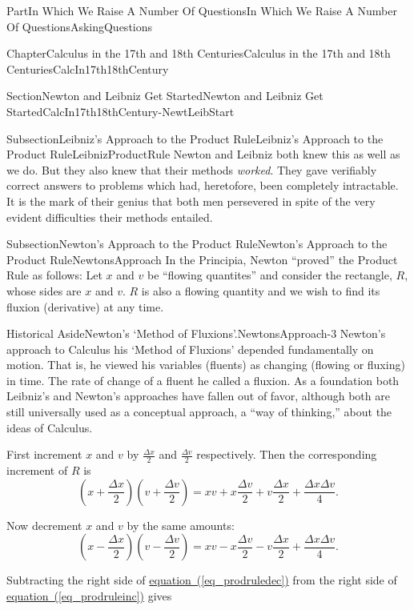\documentclass[oneside,10pt,]{book}
\newcommand{\xreffont}{\relax}
\numberwithin{equation}{part}
\begin{document}
\begin{partptx}{Part}{In Which We Raise A Number Of Questions}{}{In Which We Raise A Number Of Questions}{}{}{AskingQuestions}
\begin{chapterptx}{Chapter}{Calculus in the 17th and 18th Centuries}{}{Calculus in the 17th and 18th Centuries}{}{}{CalcIn17th18thCentury}
\begin{sectionptx}{Section}{Newton and Leibniz Get Started}{}{Newton and Leibniz Get Started}{}{}{CalcIn17th18thCentury-NewtLeibStart}
\begin{subsectionptx}{Subsection}{Leibniz's Approach to the Product Rule}{}{Leibniz's Approach to the Product Rule}{}{}{LeibnizProductRule}
Newton and Leibniz both knew this as well as we do.  But they also knew that their methods \emph{worked}.  They gave verifiably correct answers to problems which had, heretofore, been completely intractable.  It is the mark of their genius that both men persevered in spite of the very evident difficulties their methods entailed.%
\end{subsectionptx}
%
%
\typeout{************************************************}
\typeout{************************************************}
%
\begin{subsectionptx}{Subsection}{Newton's Approach to the Product Rule}{}{Newton's Approach to the Product Rule}{}{}{NewtonsApproach}
In the Principia, Newton ``proved'' the Product Rule as follows: Let \(x\) and \(v\) be ``flowing quantites'' and consider the rectangle, \(R\), whose sides are \(x\) and \(v\).  \(R\) is also a flowing quantity and we wish to find its fluxion (derivative) at any time.%
\begin{historical}{Historical Aside}{Newton's `Method of Fluxions'.}{NewtonsApproach-3}%
Newton's approach to Calculus \textemdash{} his `Method of Fluxions' \textemdash{} depended fundamentally on motion. That is, he viewed his variables (fluents) as changing (flowing or fluxing) in time.  The rate of change of a fluent he called a fluxion.  As a foundation both Leibniz's and Newton's approaches have fallen out of favor, although both are still universally used as a conceptual approach, a ``way of thinking,'' about the ideas of Calculus.%
\end{historical}
First increment \(x\) and \(v\) by \(\frac{\Delta x}{2}\) and \(\frac{\Delta v}{2}\) respectively. Then the corresponding increment of \(R\) is%
\begin{equation}
\left(x+\frac{\Delta x}{2}\right)\left(v+\frac{\Delta v}{2}\right) = xv + x\frac{\Delta v}{2} + v\frac{\Delta x}{2} +\frac{\Delta x\Delta v}{4}\text{.}\label{eq_prodruleinc}
\end{equation}
%
\par
Now decrement \(x\) and \(v\) by the same amounts:%
\begin{equation}
\left(x-\frac{\Delta x}{2}\right)\left(v-\frac{\Delta v}{2}\right) = xv - x\frac{\Delta v}{2} - v\frac{\Delta x}{2} + \frac{\Delta x\Delta v}{4}\text{.}\label{eq_prodruledec}
\end{equation}
%
\par
Subtracting the right side of \hyperref[eq_prodruledec]{equation~({\xreffont\ref{eq_prodruledec}})} from the right side of \hyperref[eq_prodruleinc]{equation~({\xreffont\ref{eq_prodruleinc}})} gives%

\end{subsectionptx}
\end{sectionptx}
\end{chapterptx}
\end{partptx}
\end{document}
